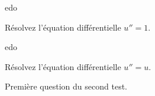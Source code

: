 \documentclass[12pt,a4paper, rulers]{tests}
\begin{document}
\vspace{3ex}

\begin{namequestion}{edo}%
  \begin{question}
    Résolvez l'équation différentielle $u'' = 1$.
  \end{question}
\end{namequestion}
\begin{namequestion}{edo}%
  \begin{question}
    Résolvez l'équation différentielle $u'' = u$.
  \end{question}
\end{namequestion}


\exam
{}
\maketitle %

\begin{question}
  Première question du second test.
\end{question}

\end{document}
